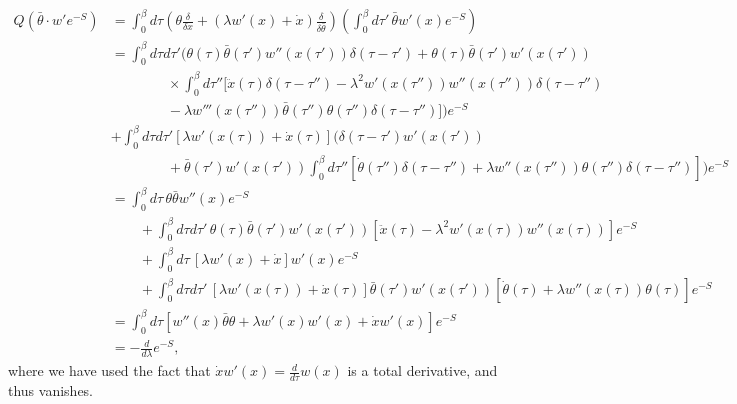 \begin{solution}
\begin{equation}
    \begin{aligned}
        Q\left(\bar\theta \cdot w' e^{-S}\right)&=
        \int_0^\beta d\tau\left(\theta\frac{\delta}{\delta x} + \left(\lambda w'(x)+\dot x\right)\frac{\delta}{\delta\bar\theta}\right)\left(\int_0^\beta d\tau'\,\bar\theta w'(x)e^{-S}\right)\\
        &=\int_0^\beta d\tau d\tau'\bigg(\theta(\tau)\bar\theta(\tau')w''(x(\tau'))\delta(\tau-\tau') + \theta(\tau)\bar\theta(\tau')w'(x(\tau'))\\
        &\qquad\qquad\times\int_0^\beta d\tau''[\ddot x(\tau)\delta(\tau-\tau'') - \lambda^2w'(x(\tau''))w''(x(\tau''))\delta(\tau-\tau'') \\
        &\qquad\qquad - \lambda w'''(x(\tau''))\bar\theta(\tau'')\theta(\tau'')\delta(\tau-\tau'')]\bigg)e^{-S}\\
        &+ \int_0^\beta d\tau d\tau'[\lambda w'(x(\tau)) + \dot{x}(\tau)]\bigg(\delta(\tau-\tau')w'(x(\tau'))\\
        &\qquad\qquad+\bar\theta(\tau')w'(x(\tau'))\int^\beta_0 d\tau''[\dot\theta(\tau'')\delta(\tau -\tau'') + \lambda w''(x(\tau''))\theta(\tau'')\delta(\tau -\tau'')]\bigg)e^{-S}\\
        &=\int^\beta_0 d\tau\, \theta\bar\theta w''(x) e^{-S} \\
        &\qquad+ \int^\beta_0 d\tau d\tau'\,\theta(\tau)\bar\theta(\tau')w'(x(\tau'))[\ddot x(\tau) - \lambda^2w'(x(\tau))w''(x(\tau))]e^{-S}\\
        &\qquad+\int^\beta_0 d\tau\,[\lambda w'(x) + \dot{x}]w'(x)e^{-S} \\
        &\qquad+ \int^\beta_0 d\tau d\tau'\,[\lambda w'(x(\tau)) + \dot{x}(\tau)]\bar\theta(\tau')w'(x(\tau'))[\dot\theta(\tau) + \lambda w''(x(\tau))\theta(\tau)]e^{-S}\\
        &=\int^\beta_0 d\tau [w''(x)\bar\theta\theta+ \lambda w'(x)w'(x) + \dot{x}w'(x)]e^{-S}\\
        &= - \frac{d}{d\lambda}e^{-S},
    \end{aligned}
\end{equation}
where we have used the fact that $\dot{x}w'(x) = \frac{d}{d\tau}w(x)$ is a total derivative, and thus vanishes.


\end{solution}
